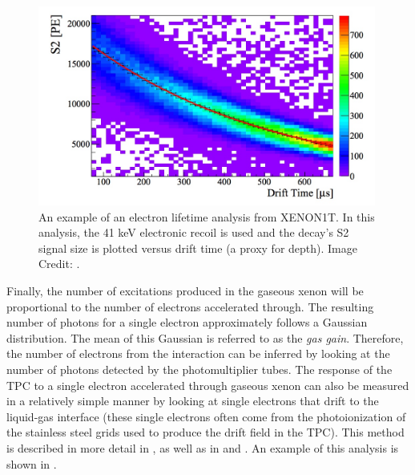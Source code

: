  \begin{figure}[t]
	\centering
	\includegraphics[width=0.99\textwidth]{tpc_electron_lifetime}
	\caption{An example of an electron lifetime analysis from XENON1T.  In this analysis, the 41 keV  electronic recoil is used and the decay's S2 signal size is plotted versus drift time (a proxy for depth).  Image Credit: .}
	\label{fig:tpc_electron_lifetime}
\end{figure}

Finally, the number of excitations produced in the gaseous xenon will be proportional to the number of electrons accelerated through.  The resulting number of photons for a single electron approximately follows a Gaussian distribution.  The mean of this Gaussian is referred to as the \textit{gas gain}.  Therefore, the number of electrons from the interaction can be inferred by looking at the number of photons detected by the photomultiplier tubes.  The response of the TPC to a single electron accelerated through gaseous xenon can also be measured in a relatively simple manner by looking at single electrons that drift to the liquid-gas interface (these single electrons often come from the photoionization of the stainless steel grids used to produce the drift field in the TPC).  This method is described in more detail in , as well as in  and .  An example of this analysis is shown in .

